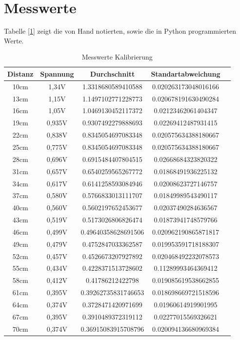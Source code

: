 \documentclass[12pt, oneside, a4paper, \docLanguage]{report}
\begin{document}
\section{Messwerte}
\label{chap:VERSUCH_1_MESSWERTE}
Tabelle [\ref{chap:VERSUCH_1_MESSWERTE}] zeigt die von Hand notierten, sowie die in Python programmierten Werte.

\begin{table}[H]
	\centering\small
	\begin{tabular}{|c|c|c|c|c|}
		\hline
		Distanz & Spannung &  Durchschnitt & Standartabweichung \\
		\hline
		10cm & 1,34V & 1.3318680589410588 & 0.020263173048016166 \\
		\hline
		13cm & 1,15V & 1.1497102771228773 & 0.020678191630490284 \\
		\hline
		16cm & 1,05V & 1.0469130452117372 & 0.02123462061404347 \\
		\hline
		19cm & 0,935V & 0.9307492279888693 & 0.02269412487931415 \\
		\hline
		22cm & 0,838V & 0.8345054697083348 & 0.020575634388180667 \\
		\hline
		25cm & 0,775V & 0.8345054697083348 & 0.020575634388180667 \\
		\hline
		28cm & 0,696V & 0.6915484407804515 & 0.02668684323820322 \\
		\hline
		31cm & 0,657V & 0.6540259565267772 & 0.01868491936225132 \\
		\hline
		34cm & 0,617V & 0.6141258593084946 & 0.02008623727146757 \\
		\hline
		37cm & 0,580V & 0.5766833013111707 & 0.01849989543490117 \\
		\hline
		40cm & 0,560V & 0.5602197652453677 & 0.02037490284636567 \\
		\hline
		43cm & 0,519V & 0.5173026806826474 & 0.01873941748579766 \\
		\hline
		46cm & 0,499V & 0.49640358628691506 & 0.020962190865871817 \\
		\hline
		49cm & 0,479V & 0.4752847033362587 & 0.019953591718188307 \\
		\hline
		52cm & 0,457V & 0.4526673207927892 & 0.020468492232078573 \\
		\hline
		55cm & 0,434V & 0.4228371513728602 & 0.11289993464369412 \\
		\hline
		58cm & 0,412V & 0.41786212422798 & 0.019085619538662855 \\
		\hline
		61cm & 0,395V & 0.39262735831746653 & 0.018698669721518596 \\
		\hline
		64cm & 0,374V & 0.3728471420971699 & 0.01960614919901995 \\
		\hline
		67cm & 0,395V & 0.3910489372319112 & 0.02277015569326621 \\
		\hline
		70cm & 0,374V & 0.36915083915708796 & 0.020094136680969384 \\
		\hline
	\end{tabular}
	\caption{Messwerte Kalibrierung}
	\label{fig:VERSUCH_1_MESSWERTE_TABELLE}
\end{table}
\end{document}
